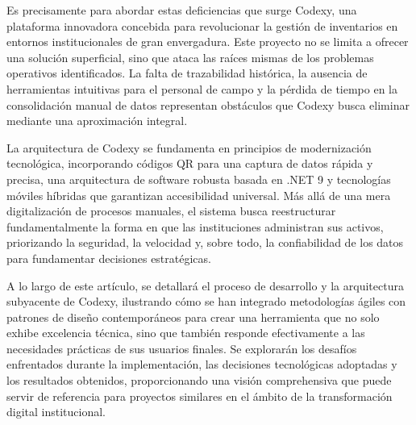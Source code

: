 Es precisamente para abordar estas deficiencias que surge Codexy, una plataforma innovadora concebida para revolucionar la gestión de inventarios en entornos institucionales de gran envergadura. Este proyecto no se limita a ofrecer una solución superficial, sino que ataca las raíces mismas de los problemas operativos identificados. La falta de trazabilidad histórica, la ausencia de herramientas intuitivas para el personal de campo y la pérdida de tiempo en la consolidación manual de datos representan obstáculos que Codexy busca eliminar mediante una aproximación integral.

La arquitectura de Codexy se fundamenta en principios de modernización tecnológica, incorporando códigos QR para una captura de datos rápida y precisa, una arquitectura de software robusta basada en .NET 9 y tecnologías móviles híbridas que garantizan accesibilidad universal. Más allá de una mera digitalización de procesos manuales, el sistema busca reestructurar fundamentalmente la forma en que las instituciones administran sus activos, priorizando la seguridad, la velocidad y, sobre todo, la confiabilidad de los datos para fundamentar decisiones estratégicas.

A lo largo de este artículo, se detallará el proceso de desarrollo y la arquitectura subyacente de Codexy, ilustrando cómo se han integrado metodologías ágiles con patrones de diseño contemporáneos para crear una herramienta que no solo exhibe excelencia técnica, sino que también responde efectivamente a las necesidades prácticas de sus usuarios finales. Se explorarán los desafíos enfrentados durante la implementación, las decisiones tecnológicas adoptadas y los resultados obtenidos, proporcionando una visión comprehensiva que puede servir de referencia para proyectos similares en el ámbito de la transformación digital institucional.